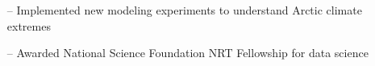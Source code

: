 \documentclass[10pt,letterpaper]{altacv} %
\begin{document}
\begin{itemize}
    \setlength{\itemindent}{0.5em}
    \item[--]   \small{Implemented new modeling experiments to understand Arctic climate extremes}
    \item[--]    \small{Awarded National Science Foundation NRT Fellowship for data science}
\end{itemize}

\smallskip
\vspace*{0.03cm}



\end{document}
